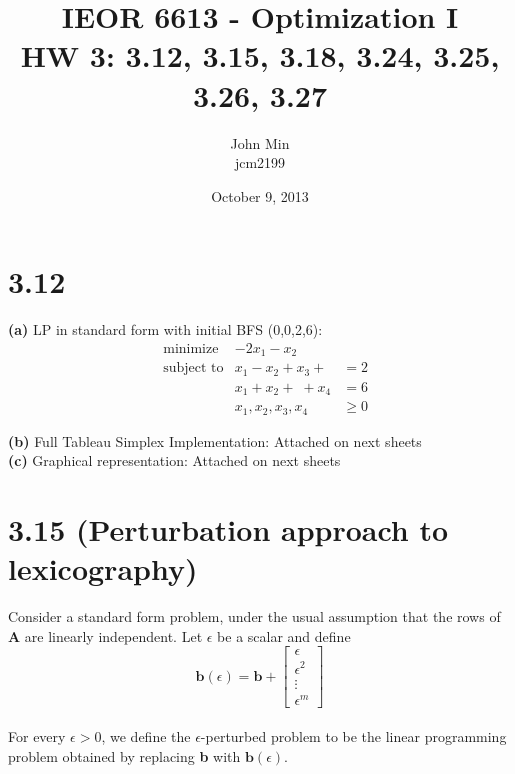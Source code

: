 \documentclass{article}
\begin{document}
\title{IEOR 6613 - Optimization I\\ HW 3:  3.12, 3.15, 3.18, 3.24, 3.25, 3.26, 3.27}

\author{John Min\\ jcm2199}
\date{October 9, 2013}
\maketitle
\pagebreak

\section*{3.12}
\textbf{(a)} LP in standard form with initial BFS (0,0,2,6):\\
\begin{equation*}
\begin{aligned}
& \text{minimize} & -2x_1 - x_2 &\\
& \text{subject to} &  x_1 - x_2 +x_3 + \; & = 2 \\
& 			&         x_1 + x_2 + \; + x_4 & = 6 \\
& 			&	x_1, x_2, x_3, x_4 & \geq 0
\end{aligned}
\end{equation*}

\noindent
\textbf{(b)} Full Tableau Simplex Implementation: Attached on next sheets\\
\textbf{(c)} Graphical representation: Attached on next sheets\\

\pagebreak

\section*{3.15 (Perturbation approach to lexicography)}
Consider a standard form problem, under the usual assumption that the rows of \textbf{A} are linearly independent.  Let $\epsilon$ be a scalar and define 
\begin{equation*}
\mathbf{b}(\epsilon) = \mathbf{b} + 
     \begin{bmatrix}
      \epsilon \\
      \epsilon^2\\
       \vdots \\
       \epsilon^m 
	\end{bmatrix}
\end{equation*} \\

\noindent 
For every $\epsilon > 0$, we define the $\epsilon$-perturbed problem to be the linear programming problem obtained by replacing \textbf{b} with $\mathbf{b}(\epsilon)$.\\
\end{document}
